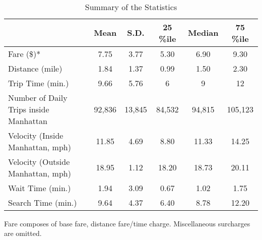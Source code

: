 \begin{table}[h]
\caption{Summary of the Statistics}\label{tab:summary_statistics}\\

{
\def\sym#1{\ifmmode^{#1}\else\(^{#1}\)\fi}
\begin{center}
\begin{tabular}{l*{5}{c}}
\hline\hline
            
            &\multicolumn{1}{c}{{Mean}}&\multicolumn{1}{c}{S.D.}&\multicolumn{1}{c}{25 \%ile}&\multicolumn{1}{c}{Median}&\multicolumn{1}{c}{75 \%ile}\\
\hline
Fare (\$)* & 7.75 & 3.77 & 5.30  & 6.90 & 9.30\\
Distance (mile) & 1.84  & 1.37 & 0.99 & 1.50 & 2.30\\
Trip Time (min.) & 9.66 & 5.76 & 6 & 9 & 12\\
Number of Daily Trips inside Manhattan & 92,836  & 13,845 & 84,532 & 94,815 & 105,123  \\
Velocity (Inside Manhattan, mph) & 11.85 & 4.69 & 8.80 & 11.33 & 14.25\\
Velocity (Outside Manhattan, mph) & 18.95 & 1.12 & 18.20 & 18.73 & 20.11\\
Wait Time (min.) & 1.94 & 3.09 & 0.67 & 1.02 & 1.75\\
Search Time (min.) & 9.64 & 4.37 & 6.40 & 8.78 & 12.20\\

\hline\hline
\end{tabular}
\end{center}
}

{\hspace{1cm}\footnotesize *Fare composes of base fare, distance fare/time charge. Miscellaneous surcharges are omitted.}\\

\end{table}


